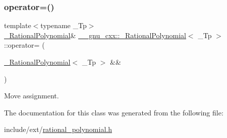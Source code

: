 \subsubsection{\texorpdfstring{operator=()}{operator=()}\hspace{0.1cm}{\footnotesize\ttfamily [2/2]}}
{\footnotesize\ttfamily template$<$typename \+\_\+\+Tp$>$ \\
\hyperlink{class____gnu__cxx_1_1__RationalPolynomial}{\+\_\+\+Rational\+Polynomial}\& \hyperlink{class____gnu__cxx_1_1__RationalPolynomial}{\+\_\+\+\_\+gnu\+\_\+cxx\+::\+\_\+\+Rational\+Polynomial}$<$ \+\_\+\+Tp $>$\+::operator= (\begin{DoxyParamCaption}\item[{\hyperlink{class____gnu__cxx_1_1__RationalPolynomial}{\+\_\+\+Rational\+Polynomial}$<$ \+\_\+\+Tp $>$ \&\&}]{ }\end{DoxyParamCaption})\hspace{0.3cm}{\ttfamily [default]}}

Move assignment. 

The documentation for this class was generated from the following file\+:\begin{DoxyCompactItemize}
\item 
include/ext/\hyperlink{rational__polynomial_8h}{rational\+\_\+polynomial.\+h}\end{DoxyCompactItemize}

